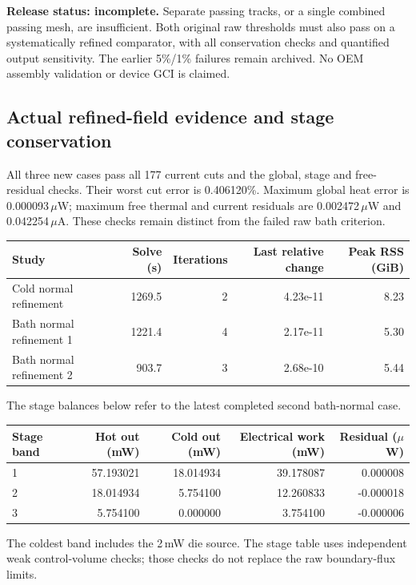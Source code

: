\textbf{Release status: incomplete.} Separate passing tracks, or a single combined passing mesh, are insufficient. Both original raw thresholds must also pass on a systematically refined comparator, with all conservation checks and quantified output sensitivity. The earlier 5\%/1\% failures remain archived. No OEM assembly validation or device GCI is claimed.
\clearpage\subsection{Actual refined-field evidence and stage conservation}
All three new cases pass all 177 current cuts and the global, stage and free-residual checks. Their worst cut error is 0.406120\%. Maximum global heat error is 0.000093\,$\mu$W; maximum free thermal and current residuals are 0.002472\,$\mu$W and 0.042254\,$\mu$A. These checks remain distinct from the failed raw bath criterion.\par
{}
\begin{center}\small\begin{tabular}{lrrrr}\toprule Study & Solve (s) & Iterations & Last relative change & Peak RSS (GiB)\\\midrule
Cold normal refinement & 1269.5 & 2 & 4.23e-11 & 8.23 \\
Bath normal refinement 1 & 1221.4 & 4 & 2.17e-11 & 5.30 \\
Bath normal refinement 2 & 903.7 & 3 & 2.68e-10 & 5.44 \\
\bottomrule\end{tabular}\end{center}
The stage balances below refer to the latest completed second bath-normal case.\par
\begin{center}\small\begin{tabular}{lrrrr}\toprule Stage band & Hot out (mW) & Cold out (mW) & Electrical work (mW) & Residual ($\mu$W)\\\midrule
1 & 57.193021 & 18.014934 & 39.178087 & 0.000008 \\
2 & 18.014934 & 5.754100 & 12.260833 & -0.000018 \\
3 & 5.754100 & 0.000000 & 3.754100 & -0.000006 \\
\bottomrule\end{tabular}\end{center}
The coldest band includes the 2\,mW die source. The stage table uses independent weak control-volume checks; those checks do not replace the raw boundary-flux limits.\par

